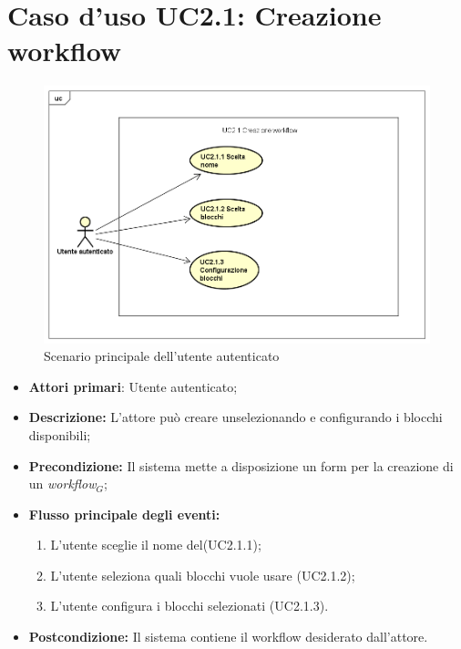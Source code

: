 		\section{Caso d'uso UC2.1: Creazione workflow}
		\begin{figure} [h]
			\centering
			\includegraphics[scale=0.4]{./Diagram/UC2-1.png}
			\caption{Scenario principale dell'utente autenticato }\label{}
		\end{figure}
		\begin{itemize}
			\item \textbf{Attori primari}: Utente autenticato;
			\item \textbf{Descrizione:} L'attore può creare unselezionando e configurando i blocchi disponibili;
			\item \textbf{Precondizione:} Il sistema mette a disposizione un form per la creazione di un \textit{workflow$_{G}$};
			\item \textbf{Flusso principale degli eventi:}
			\begin{enumerate}
				\item L'utente sceglie il nome del(UC2.1.1);
				\item L'utente seleziona quali blocchi vuole usare (UC2.1.2);
				\item L'utente configura i blocchi selezionati (UC2.1.3).
			\end{enumerate}
			\item \textbf{Postcondizione:} Il sistema contiene il workflow desiderato dall'attore.
		\end{itemize}
